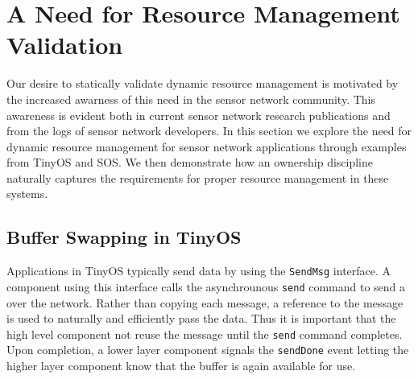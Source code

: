 \section{A Need for Resource Management Validation}


Our desire to statically validate dynamic resource management is motivated
by the increased awarness of this need in the sensor network community.
%
This awareness is evident both in current sensor network research
publications and from the logs of sensor network developers.
%
In this section we explore the need for dynamic resource management for
sensor network applications through examples from TinyOS and SOS.  
%
We then demonstrate how an ownership discipline naturally captures the
requirements for proper resource management in these systems.


\subsection{Buffer Swapping in TinyOS}


Applications in TinyOS typically send data by using the {\tt SendMsg}
interface.
%
A component using this interface calls the asynchrounous {\tt send} command
to send a  over the network.
%
Rather than copying each message, a reference to the message is used to
naturally and efficiently pass the data.
%
Thus it is important that the high level component not reuse the message
until the {\tt send} command completes.
%
Upon completion, a lower layer component signals the {\tt sendDone} event
letting the higher layer component know that the buffer is again available
for use.



